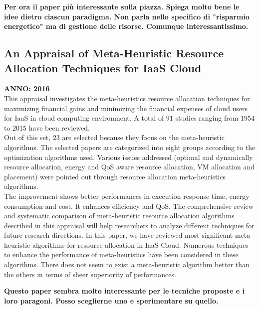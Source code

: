 \textbf{Per ora il paper più interessante sulla piazza. Spiega molto bene le idee dietro ciascun paradigma. 
Non parla nello specifico di "risparmio energetico" ma di gestione delle risorse. Comunque interessantissimo.}


\subsection{An Appraisal of Meta-Heuristic Resource Allocation Techniques for IaaS Cloud}
\textbf{ANNO: 2016}~\cite{madni2016appraisal}\\
This appraisal investigates the meta-heuristics resource allocation 
techniques for maximizing financial gains and minimizing the financial expenses of cloud users for IaaS in cloud computing 
environment. A total of $91$ studies ranging from $1954$ to $2015$ have been reviewed.\\
Out of this set, $23$ are selected because they focus on the meta-heuristic algorithms.
The selected papers are categorized into eight groups according to the optimization algorithms used. 
Various issues addressed (optimal and dynamically resource allocation, 
energy and QoS aware resource allocation, VM allocation and placement) were pointed out
through resource allocation meta-heuristics algorithms. \\
The improvement shows better performances in execution response time, energy consumption and cost.
It enhances efficiency and QoS.
The comprehensive review and systematic comparison of 
meta-heuristic resource allocation algorithms described in this appraisal will help researchers 
to analyze different techniques for future research directions.
In this paper, we have reviewed most significant
meta-heuristic algorithms for resource allocation in IaaS
Cloud. Numerous techniques to enhance the performance of meta-heuristics have been considered 
in these algorithms. 
There does not seem to exist a meta-heuristic algorithm better than the others in terms of sheer superiority of performances.

\textbf{Questo paper sembra molto interessante per le tecniche proposte e i loro paragoni. Posso sceglierne uno e sperimentare su quello.}


